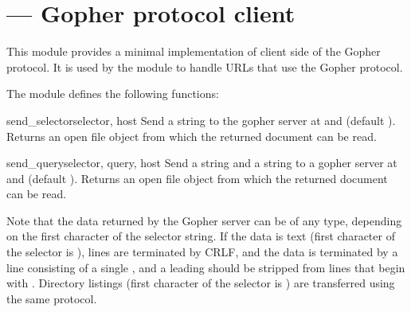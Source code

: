 \section{ ---
         Gopher protocol client}



This module provides a minimal implementation of client side of the
Gopher protocol.  It is used by the module  to
handle URLs that use the Gopher protocol.

The module defines the following functions:

\begin{funcdesc}{send_selector}{selector, host}
Send a  string to the gopher server at  and
 (default ).  Returns an open file object from
which the returned document can be read.
\end{funcdesc}

\begin{funcdesc}{send_query}{selector, query, host}
Send a  string and a  string to a gopher
server at  and  (default ).  Returns an
open file object from which the returned document can be read.
\end{funcdesc}

Note that the data returned by the Gopher server can be of any type,
depending on the first character of the selector string.  If the data
is text (first character of the selector is ), lines are
terminated by CRLF, and the data is terminated by a line consisting of
a single , and a leading  should be stripped from
lines that begin with .  Directory listings (first character
of the selector is ) are transferred using the same protocol.

